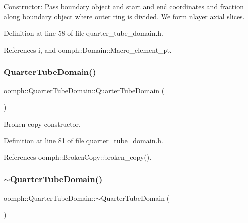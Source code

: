 Constructor\+: Pass boundary object and start and end coordinates and fraction along boundary object where outer ring is divided. We form nlayer axial slices. 



Definition at line 58 of file quarter\+\_\+tube\+\_\+domain.\+h.



References i, and oomph\+::\+Domain\+::\+Macro\+\_\+element\+\_\+pt.

\mbox{\label{classoomph_1_1QuarterTubeDomain_a3784528b5fb419be94556912166975f8}} 
\subsubsection{\texorpdfstring{Quarter\+Tube\+Domain()}{QuarterTubeDomain()}\hspace{0.1cm}{\footnotesize\ttfamily [2/2]}}
{\footnotesize\ttfamily oomph\+::\+Quarter\+Tube\+Domain\+::\+Quarter\+Tube\+Domain (\begin{DoxyParamCaption}\item[{const \hyperlink{classoomph_1_1QuarterTubeDomain}{Quarter\+Tube\+Domain} \&}]{ }\end{DoxyParamCaption})\hspace{0.3cm}{\ttfamily [inline]}}



Broken copy constructor. 



Definition at line 81 of file quarter\+\_\+tube\+\_\+domain.\+h.



References oomph\+::\+Broken\+Copy\+::broken\+\_\+copy().

\mbox{\label{classoomph_1_1QuarterTubeDomain_a191be8daa569473cebcc1466d8235175}} 
\subsubsection{\texorpdfstring{$\sim$\+Quarter\+Tube\+Domain()}{~QuarterTubeDomain()}}
{\footnotesize\ttfamily oomph\+::\+Quarter\+Tube\+Domain\+::$\sim$\+Quarter\+Tube\+Domain (\begin{DoxyParamCaption}{ }\end{DoxyParamCaption})\hspace{0.3cm}{\ttfamily [inline]}}




